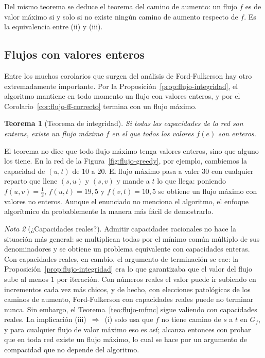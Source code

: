 \documentclass[12pt, spanish, oneside, openany]{book}
\theoremstyle{uprightplain}
\newtheorem{teorema}{Teorema}[section]
\theoremstyle{definition}
\theoremstyle{remark}
\newtheorem{nota}[teorema]{Nota}
\theoremstyle{definition}
\begin{document}
Del mismo teorema se deduce el teorema del camino de aumento: un flujo $f$ es de valor máximo si y solo si no existe ningún camino de aumento respecto de $f$. Es la equivalencia entre (ii) y (iii).

\subsection{Flujos con valores enteros}

Entre los muchos corolarios que surgen del análisis de Ford-Fulkerson hay otro extremadamente importante. Por la Proposición~\ref{prop:flujo-integridad}, el algoritmo mantiene en todo momento un flujo con valores enteros, y por el Corolario~\ref{cor:flujo-ff-correcto} termina con un flujo máximo.

\begin{teorema}[Teorema de integridad]
\label{teo:flujo-integridad}
Si todas las capacidades de la red son enteras, existe un flujo máximo $f$ en el que todos los valores $f(e)$ son enteros.
\end{teorema}

El teorema no dice que todo flujo máximo tenga valores enteros, sino que alguno los tiene. En la red de la Figura~\ref{fig:flujo-greedy}, por ejemplo, cambiemos la capacidad de $(u,t)$ de $10$ a $20$. El flujo máximo pasa a valer $30$ con cualquier reparto que llene $(s,u)$ y $(s,v)$ y mande a $t$ lo que llega: poniendo $f(u,v)=\tfrac12$, $f(u,t)=19{,}5$ y $f(v,t)=10{,}5$ se obtiene un flujo máximo con valores no enteros. Aunque el enunciado no menciona el algoritmo, el enfoque algorítmico da probablemente la manera más fácil de demostrarlo.

\begin{nota}[¿Capacidades reales?]
\label{nota:flujo-reales}
Admitir capacidades racionales no hace la situación más general: se multiplican todas por el mínimo común múltiplo de sus denominadores y se obtiene un problema equivalente con capacidades enteras. Con capacidades reales, en cambio, el argumento de terminación se cae: la Proposición~\ref{prop:flujo-integridad} era lo que garantizaba que el valor del flujo sube al menos $1$ por iteración. Con números reales el valor puede ir subiendo en incrementos cada vez más chicos, y de hecho, con elecciones patológicas de los caminos de aumento, Ford-Fulkerson con capacidades reales puede no terminar nunca. Sin embargo, el Teorema~\ref{teo:flujo-mfmc} sigue valiendo con capacidades reales. La implicación (iii)~$\Rightarrow$~(i) solo usa que $f$ no tiene camino de $s$ a $t$ en $G_f$, y para cualquier flujo de valor máximo eso es así; alcanza entonces con probar que en toda red existe un flujo máximo, lo cual se hace por un argumento de compacidad que no depende del algoritmo.
\end{nota}
\end{document}
